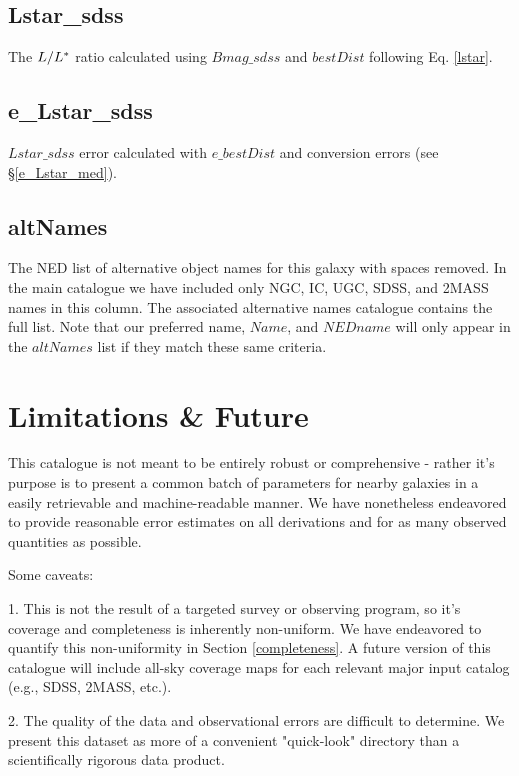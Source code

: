 \documentclass[twocolumn,tighten]{aastex62}
\begin{document}
\subsection{Lstar\_sdss}
The $L / L^{\**}$ ratio calculated using $Bmag\_sdss$ and $bestDist$ following Eq. \ref{lstar}.


\subsection{e\_Lstar\_sdss}
$Lstar\_sdss$ error calculated with $e\_bestDist$ and \cite{jester2005} conversion errors (see \S \ref{e_Lstar_med}).


\subsection{altNames}
The NED list of alternative object names for this galaxy with spaces removed. In the main catalogue we have included only NGC, IC, UGC, SDSS, and 2MASS names in this column. The associated alternative names catalogue contains the full list. Note that our preferred name, $Name$, and $NEDname$ will only appear in the $altNames$ list if they match these same criteria.\\



\section{Limitations \& Future}

This catalogue is not meant to be entirely robust or comprehensive - rather it's purpose is to present a common batch of parameters for nearby galaxies in a easily retrievable and machine-readable manner. We have nonetheless endeavored to provide reasonable error estimates on all derivations and for as many observed quantities as possible.

Some caveats:

1. This is not the result of a targeted survey or observing program, so it's coverage and completeness is inherently non-uniform. We have endeavored to quantify this non-uniformity in Section \ref{completeness}. A future version of this catalogue will include all-sky coverage maps for each relevant major input catalog (e.g., SDSS, 2MASS, etc.).

2. The quality of the data and observational errors are difficult to determine. We present this dataset as more of a convenient "quick-look" directory than a scientifically rigorous data product.
\end{document}
